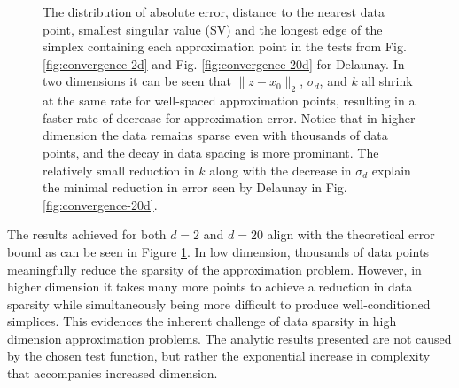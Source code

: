 \begin{figure}
  \centering
  \caption{The distribution of absolute error, distance to
    the nearest data point, smallest singular value (SV) and the
    longest edge of the simplex containing each approximation point in
    the tests from Fig. \ref{fig:convergence-2d} and
    Fig. \ref{fig:convergence-20d} for Delaunay. In two dimensions it
    can be seen that $\|z - x_0\|_2$, $\sigma_d$, and $k$ all shrink
    at the same rate for well-spaced approximation points, resulting
    in a faster rate of decrease for approximation error. Notice that
    in higher dimension the data remains sparse even with thousands of
    data points, and the decay in data spacing is more prominant. The
    relatively small reduction in $k$ along with the decrease in
    $\sigma_d$ explain the minimal reduction in error seen by Delaunay
    in Fig. \ref{fig:convergence-20d}.}
  \label{fig:data-spacing}
\end{figure}

The results achieved for both $d = 2$ and $d = 20$ align with the
theoretical error bound as can be seen in Figure
\ref{fig:data-spacing}. In low dimension, thousands of data points
meaningfully reduce the sparsity of the approximation problem.
However, in higher dimension it takes many more points to achieve a
reduction in data sparsity while simultaneously being more difficult
to produce well-conditioned simplices. This evidences the
inherent challenge of data sparsity in high dimension approximation
problems. The analytic results presented are not caused by the chosen
test function, but rather the exponential increase in complexity that
accompanies increased dimension.

